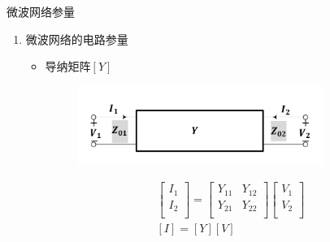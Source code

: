 \begin{frame}{微波网络参量}
    \begin{enumerate}
        \item 微波网络的电路参量
              \begin{itemize}
                  \item 导纳矩阵$[Y]$
                        \begin{figure}
                            \includegraphics[width=8cm]{Cha5//fig5-7.pdf}
                        \end{figure}
                        \begin{gather*}
                            \begin{bmatrix*}
                                I_1\\
                                I_2\\
                            \end{bmatrix*}
                            =
                            \begin{bmatrix*}
                                Y_{11} & Y_{12}\\
                                Y_{21} & Y_{22}\\
                            \end{bmatrix*}
                            \begin{bmatrix*}
                                V_1 \\
                                V_2 \\
                            \end{bmatrix*}\\
                            [I]=[Y][V]
                        \end{gather*}
              \end{itemize}
    \end{enumerate}
\end{frame}

